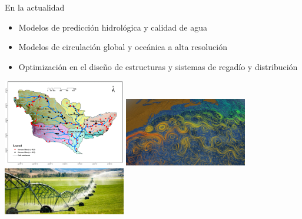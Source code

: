 \documentclass [xcolor=svgnames, t] {beamer}
\begin{document}
\begin{frame}{En la actualidad}
\vspace{-0.4cm}
\begin{exampleblock}{}
\begin{itemize}
\item Modelos de predicción hidrológica y calidad de agua
\item Modelos de circulación global y oceánica a alta resolución
\item Optimización en el diseño de estructuras y sistemas de regadío y distribución
\end{itemize}
\end{exampleblock}
\begin{center}
\includegraphics[width=0.4\textwidth]{rivba}
\includegraphics[width=0.4\textwidth]{oceanc}
\includegraphics[width=0.4\textwidth]{irriga}
\end{center}
\end{frame}
\end{document}
